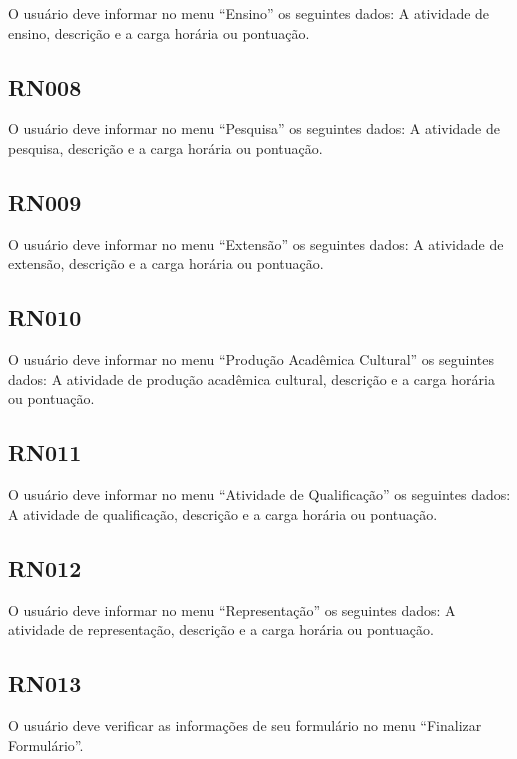 O usuário deve informar no menu ``Ensino'' os seguintes dados: A atividade de ensino, descrição e a carga horária ou pontuação. 

\subsection{RN008}\label{rn008}

O usuário deve informar no menu ``Pesquisa'' os seguintes dados: A atividade de pesquisa, descrição e a carga horária ou pontuação. 

\subsection{RN009}\label{rn009}

O usuário deve informar no menu ``Extensão'' os seguintes dados: A atividade de extensão, descrição e a carga horária ou pontuação.

\subsection{RN010}\label{rn010}

O usuário deve informar no menu ``Produção Acadêmica Cultural'' os seguintes dados: A atividade de produção acadêmica cultural, descrição e a carga horária ou pontuação.

\subsection{RN011}\label{rn011}

O usuário deve informar no menu ``Atividade de Qualificação'' os seguintes dados: A atividade de qualificação, descrição e a carga horária ou pontuação.

\subsection{RN012}\label{rn012}

O usuário deve informar no menu ``Representação'' os seguintes dados: A atividade de representação, descrição e a carga horária ou pontuação.

\subsection{RN013}\label{rn013}

O usuário deve verificar as informações de seu formulário no menu ``Finalizar Formulário''.

